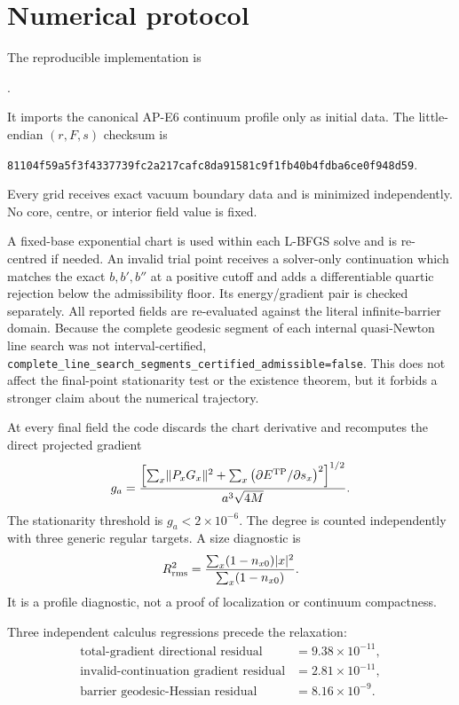 \documentclass[11pt]{article}
\numberwithin{equation}{section}
\theoremstyle{definition}
\theoremstyle{remark}
\begin{document}
\section{Numerical protocol}

The reproducible implementation is
\begin{center}
.
\end{center}
It imports the canonical AP-E6 continuum profile only as initial data.  The
little-endian \((r,F,s)\) checksum is
\begin{center}
\small\texttt{81104f59a5f3f4337739fc2a217cafc8da91581c9f1fb40b4fdba6ce0f948d59}.
\end{center}
Every grid receives exact vacuum boundary data and is minimized independently.
No core, centre, or interior field value is fixed.

A fixed-base exponential chart is used within each L-BFGS solve and is
re-centred if needed.  An invalid trial point receives a solver-only
continuation which matches the exact \(b,b',b''\) at a positive cutoff and
adds a differentiable quartic rejection below the admissibility floor.  Its
energy/gradient pair is checked separately.  All reported fields are
re-evaluated against the literal infinite-barrier domain.  Because the
complete geodesic segment of
each internal quasi-Newton line search was not interval-certified,
\texttt{complete\_line\_search\_segments\_certified\_admissible=false}.
This does not affect the final-point stationarity test or the existence
theorem, but it forbids a stronger claim about the numerical trajectory.

At every final field the code discards the chart derivative and recomputes
the direct projected gradient
\begin{equation}
 g_a=\frac{
 \left[\sum_x\lVert P_xG_x\rVert^2
 +\sum_x\left(\partial E^{\rm TP}/\partial s_x\right)^2\right]^{1/2}}
 {a^3\sqrt{4M}}.
 \label{eq:gradient-density}
\end{equation}
The stationarity threshold is \(g_a<2\times10^{-6}\).  The degree is counted
independently with three generic regular targets.  A size diagnostic is
\begin{equation}
 R_{\rm rms}^2
 =\frac{\sum_x(1-n_{x0})|x|^2}{\sum_x(1-n_{x0})}.
 \label{eq:rms-radius}
\end{equation}
It is a profile diagnostic, not a proof of localization or continuum
compactness.

Three independent calculus regressions precede the relaxation:
\begin{align}
 \text{total-gradient directional residual}&=9.38\times10^{-11},\nonumber\\
 \text{invalid-continuation gradient residual}&=2.81\times10^{-11},\nonumber\\
 \text{barrier geodesic-Hessian residual}&=8.16\times10^{-9}.
 \label{eq:calculus-residuals}
\end{align}
\end{document}
